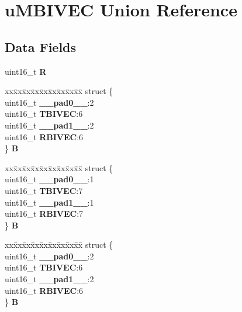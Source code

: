 \hypertarget{unionuMBIVEC}{}\section{u\+M\+B\+I\+V\+EC Union Reference}
\label{unionuMBIVEC}
\subsection*{Data Fields}
\begin{DoxyCompactItemize}
\item 
\mbox{\label{unionuMBIVEC_a8d406175ddf6bc5658afb990421bfeda}} 
uint16\+\_\+t {\bfseries R}
\item 
\mbox{\label{unionuMBIVEC_a62bdaf6317776a96ba9a7ec8cde4d1f9}} 
\begin{tabbing}
xx\=xx\=xx\=xx\=xx\=xx\=xx\=xx\=xx\=\kill
struct \{\\
\>uint16\_t {\bfseries \_\_pad0\_\_}:2\\
\>uint16\_t {\bfseries TBIVEC}:6\\
\>uint16\_t {\bfseries \_\_pad1\_\_}:2\\
\>uint16\_t {\bfseries RBIVEC}:6\\
\} {\bfseries B}\\

\end{tabbing}\item 
\mbox{\label{unionuMBIVEC_a9a1e639c55710adde48f0d2c908214df}} 
\begin{tabbing}
xx\=xx\=xx\=xx\=xx\=xx\=xx\=xx\=xx\=\kill
struct \{\\
\>uint16\_t {\bfseries \_\_pad0\_\_}:1\\
\>uint16\_t {\bfseries TBIVEC}:7\\
\>uint16\_t {\bfseries \_\_pad1\_\_}:1\\
\>uint16\_t {\bfseries RBIVEC}:7\\
\} {\bfseries B}\\

\end{tabbing}\item 
\mbox{\label{unionuMBIVEC_ab7bd3b5093143144928d59d91be69f15}} 
\begin{tabbing}
xx\=xx\=xx\=xx\=xx\=xx\=xx\=xx\=xx\=\kill
struct \{\\
\>uint16\_t {\bfseries \_\_pad0\_\_}:2\\
\>uint16\_t {\bfseries TBIVEC}:6\\
\>uint16\_t {\bfseries \_\_pad1\_\_}:2\\
\>uint16\_t {\bfseries RBIVEC}:6\\
\} {\bfseries B}\\


\end{tabbing}
\end{DoxyCompactItemize}
